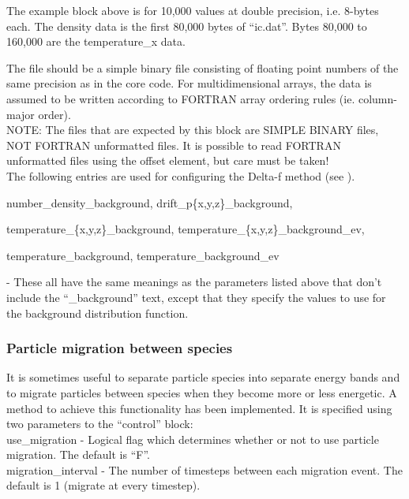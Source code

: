 The example block above is for 10,000 values at double precision, i.e. 8-bytes
each. The density data is the first 80,000 bytes of ``ic.dat''. Bytes 80,000
to 160,000 are the temperature\_x data.

The file should be a simple binary file consisting of floating point numbers of
the same precision as  in the core {\EPOCH} code. For
multidimensional arrays, the data is assumed to be written according to
FORTRAN array ordering rules (ie. column-major order).\\

{\emphtext NOTE: The files that are expected by this block are SIMPLE BINARY
files, NOT FORTRAN unformatted files. It is possible to read FORTRAN
unformatted files using the offset element, but care must be taken!}\\

The following entries are used for configuring the Delta-f method
(see ).\\

{\emphtext number\_density\_background, drift\_p\{x,y,z\}\_background,
\par temperature\_\{x,y,z\}\_background, temperature\_\{x,y,z\}\_background\_ev,
\par\vspace{3pt} temperature\_background, temperature\_background\_ev}
 - These all have the same
meanings as the parameters listed above that don't include the ``\_background''
text, except that they specify the values to use for the background distribution
function.\\

\subsubsection{Particle migration between species}
\label{sec:migration}

It is sometimes useful to separate particle species into separate energy
bands and to migrate particles between species when they become more or
less energetic. A method to achieve this functionality has been implemented.
It is specified using two parameters to the ``control'' block:\\

{\emphtext use\_migration} - Logical flag which determines whether or not to
  use particle migration. The default is ``F''.\\

{\emphtext migration\_interval} - The number of timesteps between each
  migration event.  The default is 1 (migrate at every timestep).\\

